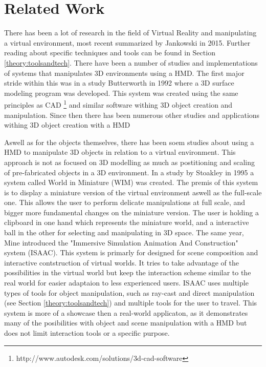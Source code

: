 \chapter{Related Work}
\label{relatedwork}
There has been a lot of research in the field of Virtual Reality and manipulating a virtual environment, most recent summarized by Jankowski in 2015. \cite{interactions:Jankowski2015} Further reading about specific techniques and tools can be found in Section \ref{theory:toolsandtech}. There have been a number of studies and implementations of systems that manipulates 3D environments using a HMD. The first major stride within this was in a study Butterworth in 1992 where a 3D surface modeling program was developed. \cite{relatedwork:Butterworth1992} This system was created using the same principles as CAD \footnote{http://www.autodesk.com/solutions/3d-cad-software} and similar software withing 3D object creation and manipulation. Since then there has been numerous other studies and applications withing 3D object creation with a HMD \cite{relatedwork:bowman1996conceptual} \cite{relatedwork:moshell1995research} \cite{relatedwork:liang1994jdcad}

Aswell as for the objects themselves, there has been soem studies about using a HMD to manipulate 3D objects in relation to a virtual environment. This approach is not as focused on 3D modelling as much as postitioning and scaling of pre-fabricated objects in a 3D environment. In a study by Stoakley in 1995 a system called World in Miniature (WIM) was created.\cite{relatedwork:stoakley1995virtual} The premis of this system is to display a miniature version of the virtual environment aswell as the full-scale one. This allows the user to perform delicate manipulations at full scale, and bigger more fundamental changes on the miniature version. The user is holding a clipboard in one hand which represents the miniature world, and a interactive ball in the other for selecting and manipulating in 3D space. The same year, Mine introduced the "Immersive Simulation
Animation And Construction" system (ISAAC).\cite{relatedwork:mine1995isaac} This system is primarly for designed for scene composition and interactive contstruction of virtual worlds. It tries to take advantage of the possibilities in the virtual world but keep the interaction scheme similar to the real world for easier adaptaion to less experienced users. ISAAC uses multiple types of tools for object manipulation, such as ray-cast and direct manipulation (see Section \ref{theory:toolsandtech}) and multiple tools for the user to travel. This system is more of a showcase then a real-world applicaton, as it demonstrates many of the posibilities with object and scene manipulation with a HMD but does not limit interaction tools or a specific purpose.

